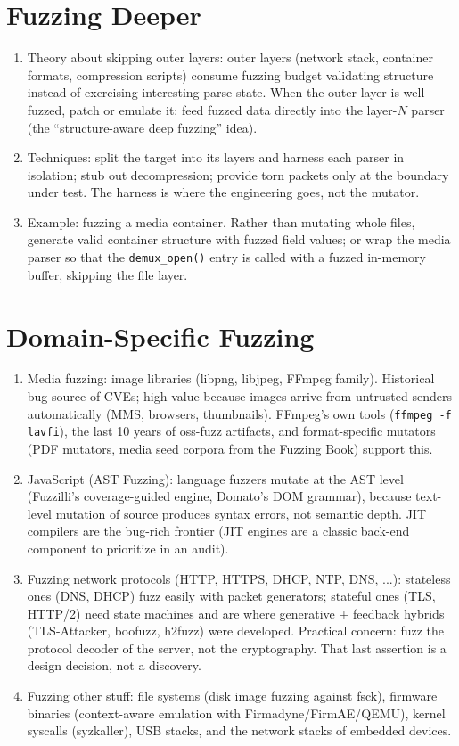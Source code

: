 \documentclass[12pt]{Training}
\begin{document}
\section*{Fuzzing Deeper}
\begin{enumerate}
    \item Theory about skipping outer layers: outer layers (network stack, container formats, compression scripts) consume fuzzing budget validating structure instead of exercising interesting parse state. When the outer layer is well-fuzzed, patch or emulate it: feed fuzzed data directly into the layer-$N$ parser (the ``structure-aware deep fuzzing'' idea).
    \item Techniques: split the target into its layers and harness each parser in isolation; stub out decompression; provide torn packets only at the boundary under test. The harness is where the engineering goes, not the mutator.
    \item Example: fuzzing a media container. Rather than mutating whole files, generate valid container structure with fuzzed field values; or wrap the media parser so that the \lstinline{demux_open()} entry is called with a fuzzed in-memory buffer, skipping the file layer.
\end{enumerate}

\section*{Domain-Specific Fuzzing}
\begin{enumerate}
    \item Media fuzzing: image libraries (libpng, libjpeg, FFmpeg family). Historical bug source of CVEs; high value because images arrive from untrusted senders automatically (MMS, browsers, thumbnails). FFmpeg's own tools (\lstinline{ffmpeg -f lavfi}), the last 10 years of oss-fuzz artifacts, and format-specific mutators (PDF mutators, media seed corpora from the Fuzzing Book) support this.
    \item JavaScript (AST Fuzzing): language fuzzers mutate at the AST level (Fuzzilli's coverage-guided engine, Domato's DOM grammar), because text-level mutation of source produces syntax errors, not semantic depth. JIT compilers are the bug-rich frontier (JIT engines are a classic back-end component to prioritize in an audit).
    \item Fuzzing network protocols (HTTP, HTTPS, DHCP, NTP, DNS, ...): stateless ones (DNS, DHCP) fuzz easily with packet generators; stateful ones (TLS, HTTP/2) need state machines and are where generative $+$ feedback hybrids (TLS-Attacker, boofuzz, h2fuzz) were developed. Practical concern: fuzz the protocol decoder of the server, not the cryptography. That last assertion is a design decision, not a discovery.
    \item Fuzzing other stuff: file systems (disk image fuzzing against fsck), firmware binaries (context-aware emulation with Firmadyne/FirmAE/QEMU), kernel syscalls (syzkaller), USB stacks, and the network stacks of embedded devices.
\end{enumerate}
\end{document}
